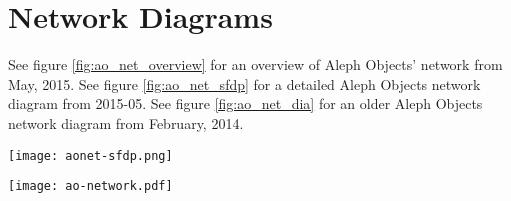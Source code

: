 \section{Network Diagrams}
See figure \ref{fig:ao_net_overview} for an overview of Aleph Objects' network from May, 2015.
See figure \ref{fig:ao_net_sfdp} for a detailed Aleph Objects network diagram from 2015-05.
See figure \ref{fig:ao_net_dia} for an older Aleph Objects network diagram from February, 2014.




\begin{sidewaysfigure}[p]
\texttt{[image: aonet-sfdp.png]}
 \caption{Aleph Objects Network Detail, May 2015}
 \label{fig:ao_net_sfdp}
\end{sidewaysfigure}

\begin{sidewaysfigure}[p]
\texttt{[image: ao-network.pdf]}
 \caption{Aleph Objects Network Diagram, February 2014}
 \label{fig:ao_net_dia}
\end{sidewaysfigure}

